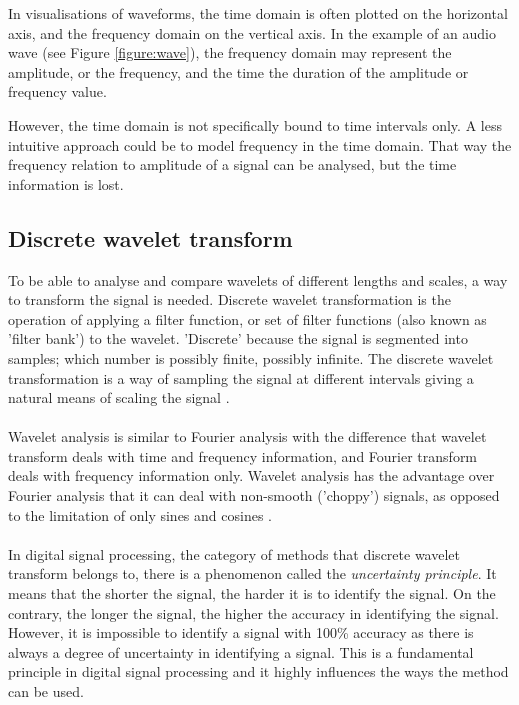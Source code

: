 In visualisations of waveforms, the time domain is often plotted on the
horizontal axis, and the frequency domain on the vertical axis. In the example
of an audio wave (see Figure \ref{figure:wave}), the frequency domain may
represent the amplitude, or the frequency, and the time the duration of the
amplitude or frequency value.



However, the time domain is not specifically bound to time intervals only. A
less intuitive approach could be to model frequency in the time domain. That
way the frequency relation to amplitude of a signal can be analysed, but the
time information is lost.

\subsection{Discrete wavelet transform}
To be able to analyse and compare wavelets of different lengths and scales, a
way to transform the signal is needed. Discrete wavelet transformation is the
operation of applying a filter function, or set of filter functions (also known
as 'filter bank') to the wavelet. 'Discrete' because the signal is segmented
into samples; which number is possibly finite, possibly infinite. The
discrete wavelet transformation is a way of sampling the signal at different
intervals giving a natural means of scaling the signal \cite{karus2013}.

\paragraph{}
Wavelet analysis is similar to Fourier analysis with the difference that
wavelet transform deals with time and frequency information, and Fourier
transform deals with frequency information only. Wavelet analysis has the
advantage over Fourier analysis that it can deal with non-smooth ('choppy')
signals, as opposed to the limitation of only sines and cosines \cite{graps}.

\paragraph{}
In digital signal processing, the category of methods that discrete wavelet
transform belongs to, there is a phenomenon called the \textit{uncertainty
principle}. It means that the shorter the signal, the harder it is to
identify the signal. On the contrary, the longer the signal, the higher the
accuracy in identifying the signal. However, it is impossible to identify a
signal with 100\% accuracy as there is always a degree of uncertainty in
identifying a signal. This is a fundamental principle in digital signal
processing and it highly influences the ways the method can be used.

